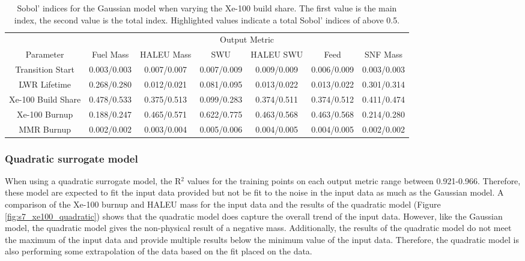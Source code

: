 \begin{table}
    \centering
    \caption{Sobol' indices for the Gaussian model when varying the 
    Xe-100 build share. The first value is the 
    main index, the second value is the total index. Highlighted 
    values indicate a total Sobol' indices of above 0.5.}
    \label{tab:s7_sobol_xe100_gaussian}
    \begin{tabular}{c c c c c c c}
        \hline
        & \multicolumn{6}{c}{Output Metric} \\
        Parameter & Fuel Mass & HALEU Mass & SWU & HALEU SWU & Feed & SNF Mass \\
        \hline
        Transition Start & 0.003/0.003 & 0.007/0.007 & 0.007/0.009 &
                           0.009/0.009 & 0.006/0.009 & 0.003/0.003\\
        LWR Lifetime & 0.268/0.280 & 0.012/0.021 & 0.081/0.095 &
                       0.013/0.022 & 0.013/0.022 & 0.301/0.314\\
        Xe-100 Build Share & \cellcolor{green!25}0.478/0.533 & \cellcolor{green!25}0.375/0.513 & 0.099/0.283 &
        \cellcolor{green!25}0.374/0.511 & \cellcolor{green!25}0.374/0.512 & 0.411/0.474\\
        Xe-100 Burnup & 0.188/0.247 & \cellcolor{green!25}0.465/0.571 & \cellcolor{green!25}0.622/0.775 & 
        \cellcolor{green!25}0.463/0.568 & \cellcolor{green!25}0.463/0.568 & 0.214/0.280\\
        MMR Burnup & 0.002/0.002 & 0.003/0.004 & 0.005/0.006 & 
                     0.004/0.005 & 0.004/0.005 & 0.002/0.002\\
        \hline        
    \end{tabular}
\end{table}

\subsubsection{Quadratic surrogate model}
When using a quadratic surrogate model, the R$^2$ values for the training points on 
each output metric range between 0.921-0.966. Therefore, these model are  
expected to 
fit the input data provided but not be fit to the noise in the input data 
as much as the Gaussian model. A comparison of the Xe-100 burnup and \gls{HALEU} 
mass for the input data and the results of the quadratic model (Figure 
\ref{fig:s7_xe100_quadratic}) shows that the quadratic model does 
capture the overall trend of the input data. However, like the Gaussian model, 
the quadratic model gives the non-physical result of a negative mass. Additionally, 
the results of the quadratic model do not meet the maximum of the input data and 
provide multiple results below the minimum value of the input data. Therefore, 
the quadratic model is also performing some extrapolation of the data based on the 
fit placed on the data.

